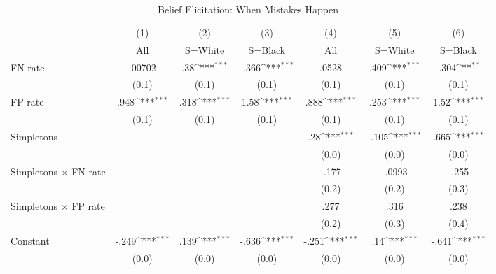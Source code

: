 \begin{table}[htbp]\centering
\def\sym#1{\ifmmode^{#1}\else\(^{#1}\)\fi}
\caption{Belief Elicitation: When Mistakes Happen}
\begin{tabular}{l*{6}{c}}
\hline\hline
                &\multicolumn{1}{c}{(1)}&\multicolumn{1}{c}{(2)}&\multicolumn{1}{c}{(3)}&\multicolumn{1}{c}{(4)}&\multicolumn{1}{c}{(5)}&\multicolumn{1}{c}{(6)}\\
                &\multicolumn{1}{c}{All}&\multicolumn{1}{c}{S=White}&\multicolumn{1}{c}{S=Black}&\multicolumn{1}{c}{All}&\multicolumn{1}{c}{S=White}&\multicolumn{1}{c}{S=Black}\\
\hline
FN rate         &   .00702         &      .38\sym{***}&    -.366\sym{***}&    .0528         &     .409\sym{***}&    -.304\sym{**} \\
                &    (0.1)         &    (0.1)         &    (0.1)         &    (0.1)         &    (0.1)         &    (0.1)         \\
FP rate         &     .948\sym{***}&     .318\sym{***}&     1.58\sym{***}&     .888\sym{***}&     .253\sym{***}&     1.52\sym{***}\\
                &    (0.1)         &    (0.1)         &    (0.1)         &    (0.1)         &    (0.1)         &    (0.1)         \\
Simpletons      &                  &                  &                  &      .28\sym{***}&    -.105\sym{***}&     .665\sym{***}\\
                &                  &                  &                  &    (0.0)         &    (0.0)         &    (0.0)         \\
Simpletons $\times$ FN rate&                  &                  &                  &    -.177         &   -.0993         &    -.255         \\
                &                  &                  &                  &    (0.2)         &    (0.2)         &    (0.3)         \\
Simpletons $\times$ FP rate&                  &                  &                  &     .277         &     .316         &     .238         \\
                &                  &                  &                  &    (0.2)         &    (0.3)         &    (0.4)         \\
Constant        &    -.249\sym{***}&     .139\sym{***}&    -.636\sym{***}&    -.251\sym{***}&      .14\sym{***}&    -.641\sym{***}\\
                &    (0.0)         &    (0.0)         &    (0.0)         &    (0.0)         &    (0.0)         &    (0.0)         \\

\end{tabular}
\end{table}
